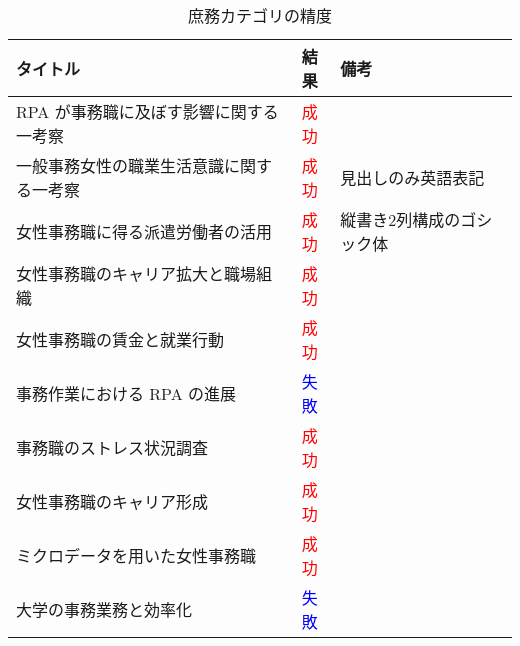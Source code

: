 \begin{table}[h]
  \label{tab:doc_operation}
  \begin{center}
  \begin{tabular}{|l|c|l|}
    \hline
    \textbf{タイトル} & \textbf{結果} & \textbf{備考} \\ \hline
    RPA が事務職に及ぼす影響に関する一考察 & \textcolor{red}{成功} & \\ \hline
    一般事務女性の職業生活意識に関する一考察 & \textcolor{red}{成功} & 見出しのみ英語表記 \\ \hline
    女性事務職に得る派遣労働者の活用 & \textcolor{red}{成功} & 縦書き2列構成のゴシック体 \\ \hline
    女性事務職のキャリア拡大と職場組織 & \textcolor{red}{成功} & \\ \hline
    女性事務職の賃金と就業行動 & \textcolor{red}{成功} & \\ \hline
    事務作業における RPA の進展 & \textcolor{blue}{失敗} & \\ \hline
    事務職のストレス状況調査 & \textcolor{red}{成功} & \\ \hline
    女性事務職のキャリア形成 & \textcolor{red}{成功} & \\ \hline
    ミクロデータを用いた女性事務職 & \textcolor{red}{成功} & \\ \hline
    大学の事務業務と効率化 & \textcolor{blue}{失敗} & \\ \hline
  \end{tabular}
  \end{center}
  \caption{庶務カテゴリの精度}
\end{table}
\clearpage

